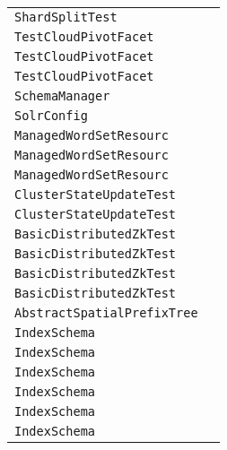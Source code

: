 \begin{center}
\begin{tabular}{ll}
\lstinline/ShardSplitTest/&\raisebox{0pt}{\lstinline/logDebugHelp(int[])/}\\
\lstinline/TestCloudPivotFacet/&\raisebox{0pt}{\lstinline/assertPivotCountsAreCorrect()/}\\
\lstinline/TestCloudPivotFacet/&\raisebox{0pt}{\lstinline/assertPivotCountsAreCorrect()/}\\
\lstinline/TestCloudPivotFacet/&\raisebox{0pt}{\lstinline/assertPivotCountsAreCorrect()/}\\
\lstinline/SchemaManager/&\raisebox{0pt}{\lstinline/ManagedIndexSchemagetFreshManagedSchema(SolrCore)/}\\
\lstinline/SolrConfig/&\raisebox{0pt}{\lstinline/HttpCachingConfig(SolrConfigconf)/}\\
\lstinline/ManagedWordSetResourc/&\raisebox{0pt}{\lstinline/applyUpdatesToManagedData(Object)/}\\
\lstinline/ManagedWordSetResourc/&\raisebox{0pt}{\lstinline/applyUpdatesToManagedData(Object)/}\\
\lstinline/ManagedWordSetResourc/&\raisebox{0pt}{\lstinline/applyUpdatesToManagedData(Object)/}\\
\lstinline/ClusterStateUpdateTest/&\raisebox{0pt}{\lstinline/setUp()/}\\
\lstinline/ClusterStateUpdateTest/&\raisebox{0pt}{\lstinline/setUp()/}\\
\lstinline/BasicDistributedZkTest/&\raisebox{0pt}{\lstinline/testMultipleCollections()/}\\
\lstinline/BasicDistributedZkTest/&\raisebox{0pt}{\lstinline/testMultipleCollections()/}\\
\lstinline/BasicDistributedZkTest/&\raisebox{0pt}{\lstinline/testMultipleCollections()/}\\
\lstinline/BasicDistributedZkTest/&\raisebox{0pt}{\lstinline/testMultipleCollections()/}\\
\lstinline/AbstractSpatialPrefixTree/&\raisebox{0pt}{\lstinline/TnewSpatialStrategy(String)/}\\
\lstinline/IndexSchema/&\raisebox{0pt}{\lstinline/new()/}\\
\lstinline/IndexSchema/&\raisebox{0pt}{\lstinline/new()/}\\
\lstinline/IndexSchema/&\raisebox{0pt}{\lstinline/new()/}\\
\lstinline/IndexSchema/&\raisebox{0pt}{\lstinline/new()/}\\
\lstinline/IndexSchema/&\raisebox{0pt}{\lstinline/new()/}\\
\lstinline/IndexSchema/&\raisebox{0pt}{\lstinline/new()/}\\

\end{tabular}
\end{center}
